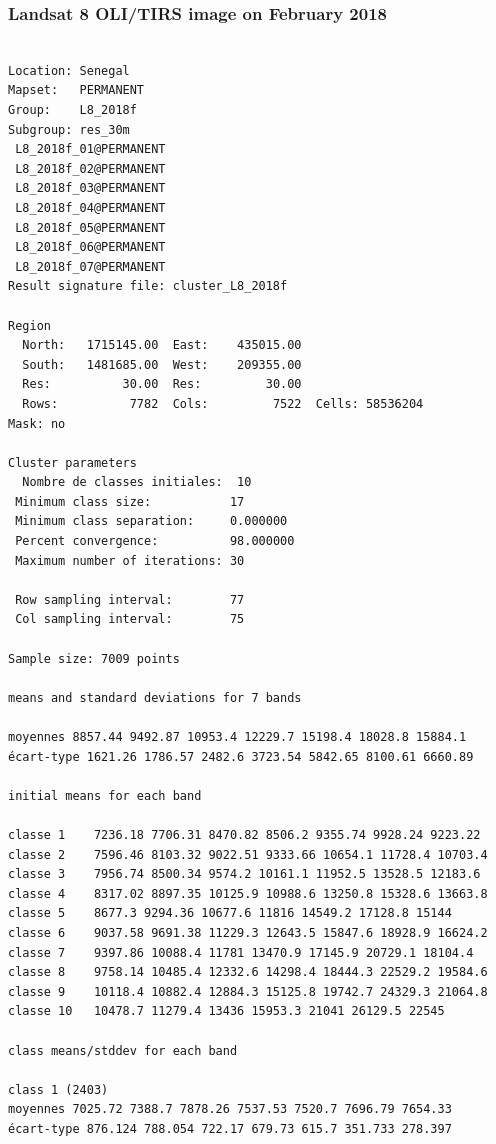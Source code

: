 \documentclass[land,article,submit,pdftex,moreauthors]{Definitions/mdpi}
\begin{document}
\subsubsection[\appendixname~\thesubsubsection]{Landsat 8 OLI/TIRS image on February 2018}
\begin{scriptsize}
\begin{verbatim}

Location: Senegal
Mapset:   PERMANENT
Group:    L8_2018f
Subgroup: res_30m
 L8_2018f_01@PERMANENT
 L8_2018f_02@PERMANENT
 L8_2018f_03@PERMANENT
 L8_2018f_04@PERMANENT
 L8_2018f_05@PERMANENT
 L8_2018f_06@PERMANENT
 L8_2018f_07@PERMANENT
Result signature file: cluster_L8_2018f

Region
  North:   1715145.00  East:    435015.00
  South:   1481685.00  West:    209355.00
  Res:          30.00  Res:         30.00
  Rows:          7782  Cols:         7522  Cells: 58536204
Mask: no

Cluster parameters
  Nombre de classes initiales: 	10
 Minimum class size:           17
 Minimum class separation:     0.000000
 Percent convergence:          98.000000
 Maximum number of iterations: 30

 Row sampling interval:        77
 Col sampling interval:        75

Sample size: 7009 points

means and standard deviations for 7 bands

moyennes 8857.44 9492.87 10953.4 12229.7 15198.4 18028.8 15884.1
écart-type 1621.26 1786.57 2482.6 3723.54 5842.65 8100.61 6660.89

initial means for each band

classe 1    7236.18 7706.31 8470.82 8506.2 9355.74 9928.24 9223.22
classe 2    7596.46 8103.32 9022.51 9333.66 10654.1 11728.4 10703.4
classe 3    7956.74 8500.34 9574.2 10161.1 11952.5 13528.5 12183.6
classe 4    8317.02 8897.35 10125.9 10988.6 13250.8 15328.6 13663.8
classe 5    8677.3 9294.36 10677.6 11816 14549.2 17128.8 15144
classe 6    9037.58 9691.38 11229.3 12643.5 15847.6 18928.9 16624.2
classe 7    9397.86 10088.4 11781 13470.9 17145.9 20729.1 18104.4
classe 8    9758.14 10485.4 12332.6 14298.4 18444.3 22529.2 19584.6
classe 9    10118.4 10882.4 12884.3 15125.8 19742.7 24329.3 21064.8
classe 10   10478.7 11279.4 13436 15953.3 21041 26129.5 22545

class means/stddev for each band

class 1 (2403)
moyennes 7025.72 7388.7 7878.26 7537.53 7520.7 7696.79 7654.33
écart-type 876.124 788.054 722.17 679.73 615.7 351.733 278.397


\end{verbatim}
\end{scriptsize}
\end{document}
